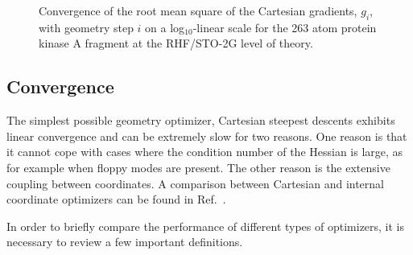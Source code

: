 \documentclass[prl,twocolumn,showpacs,twocolumngrid,superbib]{revtex4}
\begin{document}
\begin{figure}[h]
\caption{
Convergence of the root mean square of the Cartesian gradients, $g_{i}$,
with geometry step $i$ on a log$_{10}$-linear  scale for the 
263 atom protein kinase A fragment at the RHF/STO-2G level of theory.}\label{gradientpicture} 
\end{figure}

\subsection{Convergence}

The simplest possible geometry optimizer, Cartesian steepest descents exhibits linear convergence and can 
be extremely slow for two reasons. One reason is that it cannot cope with 
cases where the condition number of the Hessian is large, 
as for example when floppy modes are present. 
The other reason is the extensive coupling between coordinates.
A comparison between Cartesian and internal coordinate optimizers can be
found in Ref.~\cite{bakerstest}.

In order to briefly compare the performance of different types of optimizers,
it is necessary to review a few important definitions.

\end{document}
